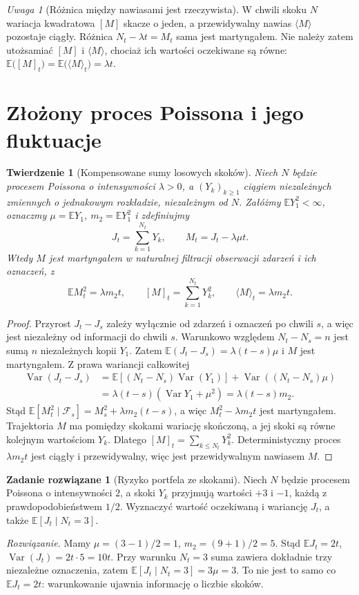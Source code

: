 \documentclass[11pt,a4paper,oneside]{report}
\numberwithin{equation}{chapter}
\theoremstyle{plain}
\newtheorem{twierdzenie}{Twierdzenie}[chapter]
\theoremstyle{definition}
\newtheorem{zadanie}{Zadanie rozwiązane}[chapter]
\theoremstyle{remark}
\newtheorem{uwaga}{Uwaga}[chapter]
\newcommand{\E}{\mathbb{E}}
\newcommand{\Var}{\operatorname{Var}}
\newcommand{\calF}{\mathcal{F}}
\begin{document}
\begin{uwaga}[Różnica między nawiasami jest rzeczywista]
W chwili skoku $N$ wariacja kwadratowa $[M]$ skacze
o jeden, a przewidywalny nawias $\langle M\rangle$
pozostaje ciągły. Różnica $N_t-\lambda t=M_t$
sama jest martyngałem. Nie należy zatem utożsamiać
$[M]$ i $\langle M\rangle$, chociaż ich wartości
oczekiwane są równe: $\E\bigl([M]_t\bigr)=\E\bigl(\langle M\rangle_t\bigr)=\lambda t$.
\end{uwaga}

\section{Złożony proces Poissona i jego fluktuacje}
\begin{twierdzenie}[Kompensowane sumy losowych skoków]
Niech $N$ będzie procesem Poissona o intensywności
$\lambda>0$, a $(Y_k)_{k\ge1}$ ciągiem niezależnych
zmiennych o jednakowym rozkładzie, niezależnym od $N$.
Załóżmy $\E Y_1^2<\infty$, oznaczmy
$\mu=\E Y_1$, $m_2=\E Y_1^2$ i zdefiniujmy
\[
J_t=\sum_{k=1}^{N_t}Y_k,\qquad
M_t=J_t-\lambda\mu t.
\]
Wtedy $M$ jest martyngałem w naturalnej filtracji
obserwacji zdarzeń i ich oznaczeń, z
\[
\E M_t^2=\lambda m_2t,\qquad
[M]_t=\sum_{k=1}^{N_t}Y_k^2,\qquad
\langle M\rangle_t=\lambda m_2t.
\]
\end{twierdzenie}
\begin{proof}
Przyrost $J_t-J_s$ zależy wyłącznie od zdarzeń i oznaczeń
po chwili $s$, a więc jest niezależny od informacji do
chwili $s$. Warunkowo względem $N_t-N_s=n$ jest sumą
$n$ niezależnych kopii $Y_1$. Zatem
$\E(J_t-J_s)=\lambda(t-s)\mu$ i $M$ jest martyngałem.
Z prawa wariancji całkowitej
\[
\begin{aligned}
\Var(J_t-J_s)
&=\E[(N_t-N_s)\Var(Y_1)]
 +\Var((N_t-N_s)\mu)\\
&=\lambda(t-s)(\Var Y_1+\mu^2)
=\lambda(t-s)m_2.
\end{aligned}
\]
Stąd $\E[M_t^2\mid\calF_s]
=M_s^2+\lambda m_2(t-s)$, a więc
$M_t^2-\lambda m_2t$ jest martyngałem.
Trajektoria $M$ ma pomiędzy skokami wariację skończoną,
a jej skoki są równe kolejnym wartościom $Y_k$.
Dlatego $[M]_t=\sum_{k\le N_t}Y_k^2$.
Deterministyczny proces $\lambda m_2t$ jest
ciągły i przewidywalny, więc jest przewidywalnym
nawiasem $M$.
\end{proof}

\begin{zadanie}[Ryzyko portfela ze skokami]
Niech $N$ będzie procesem Poissona o intensywności $2$,
a skoki $Y_k$ przyjmują wartości $+3$ i $-1$,
każdą z prawdopodobieństwem $1/2$.
Wyznaczyć wartość oczekiwaną i wariancję $J_t$,
a także $\E[J_t\mid N_t=3]$.

\emph{Rozwiązanie.} Mamy
$\mu=(3-1)/2=1$, $m_2=(9+1)/2=5$.
Stąd $\E J_t=2t$, $\Var(J_t)=2t\cdot5=10t$.
Przy warunku $N_t=3$ suma zawiera dokładnie
trzy niezależne oznaczenia, zatem
$\E[J_t\mid N_t=3]=3\mu=3$.
To nie jest to samo co $\E J_t=2t$:
warunkowanie ujawnia informację o liczbie skoków.
\end{zadanie}
\end{document}
